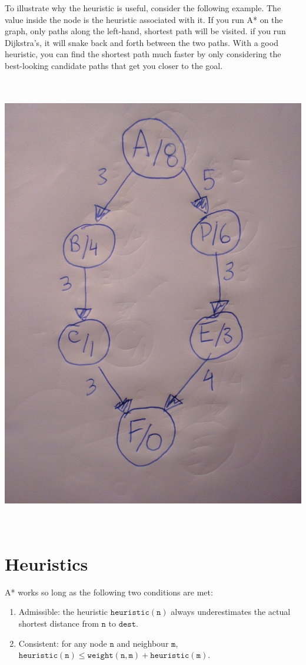\documentclass[a4paper,12pt]{article}
\newcommand{\kwa}[1]{\mathtt{#1}}
\begin{document}
\noindent
To illustrate why the heuristic is useful, consider the following example. The value inside the node is the heuristic associated with it. If you run A* on the graph, only paths along the left-hand, shortest path will be visited. if you run Dijkstra's, it will snake back and forth between the two paths. With a good heuristic, you can find the shortest path much faster by only considering the best-looking candidate paths that get you closer to the goal.


~\\~\\
\includegraphics[scale=0.1]{fig_astar}
~\\~\\

\section{Heuristics}

A* works so long as the following two conditions are met:
\begin{enumerate}
	\item Admissible: the heuristic $\kwa{heuristic(n)}$ always underestimates the actual shortest distance from $\kwa{n}$ to $\kwa{dest}$.
	\item Consistent: for any node $\kwa{n}$ and neighbour $\kwa{m}$, $\kwa{heuristic(n) \leq weight(n, m) + heuristic(m)}$.
\end{enumerate}
\end{document}
